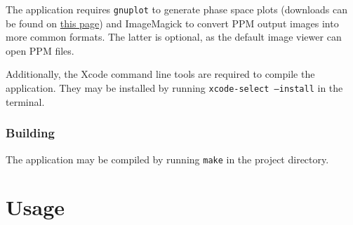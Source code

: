 \documentclass[a4paper,12pt]{article}
\begin{document}
The application requires \texttt{gnuplot} to generate phase space plots (downloads can be found on
\href{https://csml-wiki.northwestern.edu/index.php/Binary_versions_of_Gnuplot_for_OS_X}{this page})
and ImageMagick to convert PPM output images into more common formats.
The latter is optional, as the default image viewer can open PPM files.

Additionally, the Xcode command line tools are required to compile the application.
They may be installed by running \texttt{xcode-select --install} in the terminal.

\subsubsection{Building}

The application may be compiled by running \texttt{make} in the project directory.

\section{Usage}
\end{document}
